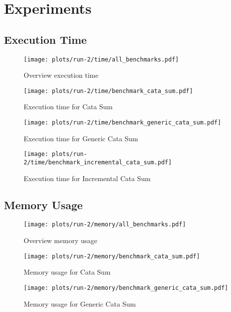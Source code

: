 \chapter{Experiments}

\section{Execution Time}
\begin{figure}[H]
    \centering
    \texttt{[image: plots/run-2/time/all\_benchmarks.pdf]}
    \caption{Overview execution time}
    \label{fig-exec-time-overview}
\end{figure}

\begin{figure}[H]
    \centering
    \texttt{[image: plots/run-2/time/benchmark\_cata\_sum.pdf]}
    \caption{Execution time for Cata Sum}
    \label{fig-exec-time-cata-sum}
\end{figure}

\begin{figure}[H]
    \centering
    \texttt{[image: plots/run-2/time/benchmark\_generic\_cata\_sum.pdf]}
    \caption{Execution time for Generic Cata Sum}
    \label{fig-exec-time-gen-cata-sum}
\end{figure}

\begin{figure}[H]
    \centering
    \texttt{[image: plots/run-2/time/benchmark\_incremental\_cata\_sum.pdf]}
    \caption{Execution time for Incremental Cata Sum}
    \label{fig-exec-time-inc-cata-sum}
\end{figure}


\section{Memory Usage}
\begin{figure}[H]
    \centering
    \texttt{[image: plots/run-2/memory/all\_benchmarks.pdf]}
    \caption{Overview memory usage}
    \label{fig-bytes-all-overview}
\end{figure}

\begin{figure}[H]
    \centering
    \texttt{[image: plots/run-2/memory/benchmark\_cata\_sum.pdf]}
    \caption{Memory usage for Cata Sum}
    \label{fig-bytes-all-cata-sum}
\end{figure}

\begin{figure}[H]
    \centering
    \texttt{[image: plots/run-2/memory/benchmark\_generic\_cata\_sum.pdf]}
    \caption{Memory usage for Generic Cata Sum}
    \label{fig-bytes-all-gen-cata-sum}
\end{figure}

